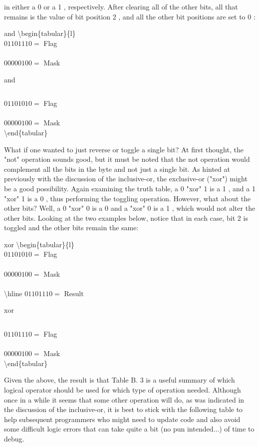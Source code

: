 \documentclass[10pt]{article}
\begin{document}
in either a 0 or a 1 , respectively. After clearing all of the other bits, all that remains is the value of bit position 2 , and all the other bit positions are set to 0 :

and \textbackslash begin\{tabular\}\{l\}\\
$01101110=$ Flag \\
\\
$00000100=$ Mask

 and \begin{tabular}{l}
\end{tabular}

$01101010=$ Flag \\
\\
$00000100=$ Mask\\
\textbackslash end\{tabular\}

What if one wanted to just reverse or toggle a single bit? At first thought, the "not" operation sounds good, but it must be noted that the not operation would complement all the bits in the byte and not just a single bit. As hinted at previously with the discussion of the inclusive-or, the exclusive-or ("xor") might be a good possibility. Again examining the truth table, a 0 "xor" 1 is a 1 , and a 1 "xor" 1 is a 0 , thus performing the toggling operation. However, what about the other bits? Well, a 0 "xor" 0 is a 0 and a "xor" 0 is a 1 , which would not alter the other bits. Looking at the two examples below, notice that in each case, bit 2 is toggled and the other bits remain the same:

xor \textbackslash begin\{tabular\}\{l\}\\
$01101010=$ Flag \\
\\
$00000100=$ Mask \\
\\
\textbackslash hline $01101110=$ Result

 xor $\quad$\begin{tabular}{l}
\end{tabular}

$01101110=$ Flag \\
\\
$00000100=$ Mask\\
\textbackslash end\{tabular\}

Given the above, the result is that Table B. 3 is a useful summary of which logical operator should be used for which type of operation needed. Although once in a while it seems that some other operation will do, as was indicated in the discussion of the inclusive-or, it is best to stick with the following table to help subsequent programmers who might need to update code and also avoid some difficult logic errors that can take quite a bit (no pun intended...) of time to debug.
\end{document}
